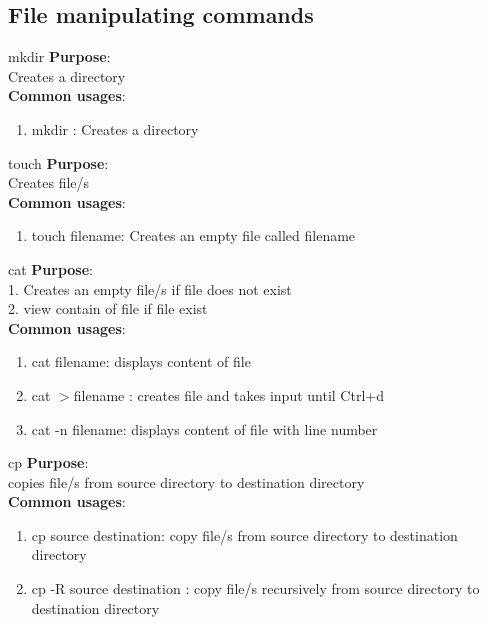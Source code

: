 \documentclass[11pt]{beamer}
\begin{document}
\subsection{File manipulating commands}
\begin{frame}{mkdir}
\textbf{Purpose}:\\
\large Creates a directory\vspace{1cm}\pause \\
 
\textbf{Common usages}:\\
\begin{enumerate}
\item mkdir : Creates a directory
\end{enumerate}
\end{frame}

\begin{frame}{touch}
\textbf{Purpose}:\\
\large Creates file/s\vspace{1cm}\pause \\
 
\textbf{Common usages}:\\
\begin{enumerate}
\item touch filename: Creates an empty file called filename
\end{enumerate}
\end{frame}

\begin{frame}{cat}
\textbf{Purpose}:\\
\large 1. Creates an empty file/s if file does not exist\\
2.  view contain of file if file exist\vspace{1cm}\pause \\
 
\textbf{Common usages}:\\
\begin{enumerate}
\item cat filename: displays content of file
\item cat $>$filename : creates file and takes input until Ctrl+d
\item cat -n filename: displays content of file with line number

\end{enumerate}
\end{frame}

\begin{frame}{cp}
\textbf{Purpose}:\\
\large copies file/s from source directory to destination directory\vspace{1cm}\pause \\
 
\textbf{Common usages}:\\
\begin{enumerate}
\item cp source destination: copy file/s from source directory to destination directory
\item cp -R source destination : copy file/s recursively from source directory to destination directory
\end{enumerate}
\end{frame}
\end{document}
